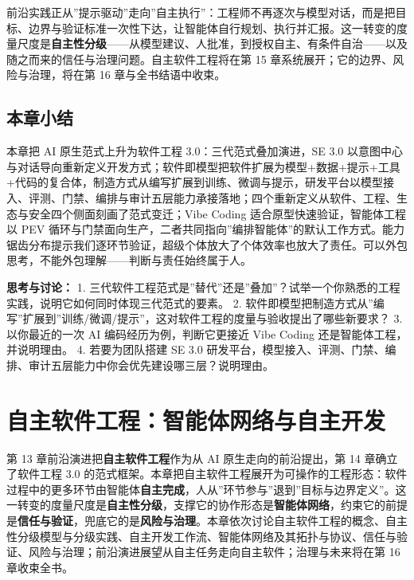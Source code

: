 \documentclass[12pt,a4paper,twoside,openany]{ctexbook}
\numberwithin{figure}{chapter}
\numberwithin{table}{chapter}
\begin{document}
前沿实践正从''提示驱动''走向''自主执行''：工程师不再逐次与模型对话，而是把目标、边界与验证标准一次性下达，让智能体自行规划、执行并汇报。这一转变的度量尺度是\textbf{自主性分级}------从模型建议、人批准，到授权自主、有条件自治------以及随之而来的信任与治理问题。自主软件工程将在第
15 章系统展开；它的边界、风险与治理，将在第 16 章与全书结语中收束。

\section{本章小结}\label{ux672cux7ae0ux5c0fux7ed3-13}

本章把 AI 原生范式上升为软件工程 3.0：三代范式叠加演进，SE 3.0
以意图中心与对话导向重新定义开发方式；软件即模型把软件扩展为模型+数据+提示+工具+代码的复合体，制造方式从编写扩展到训练、微调与提示，研发平台以模型接入、评测、门禁、编排与审计五层能力承接落地；四个重新定义从软件、工程、生态与安全四个侧面刻画了范式变迁；Vibe
Coding 适合原型快速验证，智能体工程以 PEV
循环与门禁面向生产，二者共同指向''编排智能体''的默认工作方式。能力锯齿分布提示我们逐环节验证，超级个体放大了个体效率也放大了责任。可以外包思考，不能外包理解------判断与责任始终属于人。

\textbf{思考与讨论：} 1.
三代软件工程范式是''替代''还是''叠加''？试举一个你熟悉的工程实践，说明它如何同时体现三代范式的要素。
2.
软件即模型把制造方式从''编写''扩展到''训练/微调/提示''，这对软件工程的度量与验收提出了哪些新要求？
3. 以你最近的一次 AI 编码经历为例，判断它更接近 Vibe Coding
还是智能体工程，并说明理由。 4. 若要为团队搭建 SE 3.0
研发平台，模型接入、评测、门禁、编排、审计五层能力中你会优先建设哪三层？说明理由。

\chapter{自主软件工程：智能体网络与自主开发}\label{ux81eaux4e3bux8f6fux4ef6ux5de5ux7a0bux667aux80fdux4f53ux7f51ux7edcux4e0eux81eaux4e3bux5f00ux53d1}

第 13 章前沿演进把\textbf{自主软件工程}作为从 AI 原生走向的前沿提出，第
14 章确立了软件工程 3.0
的范式框架。本章把自主软件工程展开为可操作的工程形态：软件过程中的更多环节由智能体\textbf{自主完成}，人从''环节参与''退到''目标与边界定义''。这一转变的度量尺度是\textbf{自主性分级}，支撑它的协作形态是\textbf{智能体网络}，约束它的前提是\textbf{信任与验证}，兜底它的是\textbf{风险与治理}。本章依次讨论自主软件工程的概念、自主性分级模型与分级实践、自主开发工作流、智能体网络及其拓扑与协议、信任与验证、风险与治理；前沿演进展望从自主任务走向自主软件；治理与未来将在第
16 章收束全书。
\end{document}
